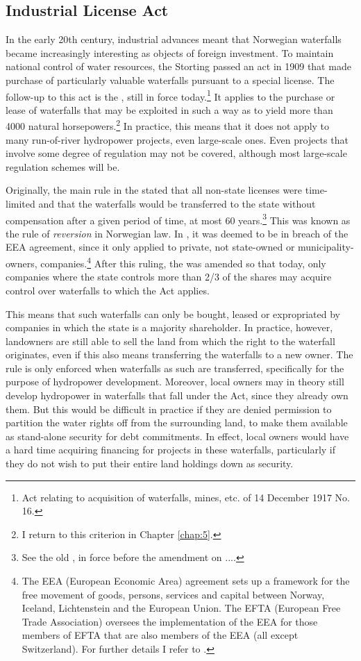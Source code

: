 \subsection{Industrial License Act}\label{sec:ica17}

In the early 20th century, industrial advances meant that Norwegian waterfalls became increasingly interesting as objects of foreign investment. To maintain national control of water resources, the Storting passed an act in 1909 that made purchase of particularly valuable waterfalls pursuant to a special license. The follow-up to this act is the \cite{ica17}, still in force today.\footnote{Act relating to acquisition of waterfalls, mines, etc. of 14 December 1917 No. 16.} It applies to the purchase or lease of waterfalls that may be exploited in such a way as to yield more than 4000 natural horsepowers.\footnote{I return to this criterion in Chapter \ref{chap:5}.} In practice, this means that it does not apply to many run-of-river hydropower projects, even large-scale ones. Even projects that involve some degree of regulation may not be covered, although most large-scale regulation schemes will be.

Originally, the main rule in the \cite{ica17} stated that all non-state licenses were time-limited and that the waterfalls would be transferred to the state without compensation after a given period of time, at most 60 years.\footnote{See the old \cite[2]{ica17}, in force before the amendment on ....} This was known as the rule of {\it reversion} in Norwegian law. In \cite{efta07}, it was deemed to be in breach of the EEA agreement, since it only applied to private, not state-owned or municipality-owners, companies.\footnote{The EEA (European Economic Area) agreement sets up a framework for the free movement of goods, persons, services and capital between Norway, Iceland, Lichtenstein and the European Union. The EFTA (European Free Trade Association) oversees the implementation of the EEA for those members of EFTA that are also members of the EEA (all except Switzerland). For further details I refer to \cite{...}.} After this ruling, the \cite{ica17} was amended so that today, only companies where the state controls more than 2/3 of the shares may acquire control over waterfalls to which the Act applies.

This means that such waterfalls can only be bought, leased or expropriated by companies in which the state is a majority shareholder. In practice, however, landowners are still able to sell the land from which the right to the waterfall originates, even if this also means transferring the waterfalls to a new owner. The rule is only enforced when waterfalls as such are transferred, specifically for the purpose of hydropower development. Moreover, local owners may in theory still develop hydropower in waterfalls that fall under the Act, since they already own them. But this would be difficult in practice if they are denied permission to partition the water rights off from the surrounding land, to make them available as stand-alone security for debt commitments. In effect, local owners would have a hard time acquiring financing for projects in these waterfalls, particularly if they do not wish to put their entire land holdings down as security.

